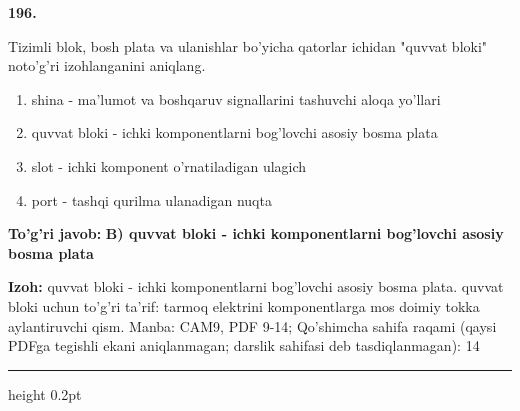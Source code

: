 \documentclass[10pt,a4paper]{article}
\begin{document}
{\bfseries\sffamily\color{ink} 196.}
\par
Tizimli blok, bosh plata va ulanishlar bo'yicha qatorlar ichidan "quvvat bloki" noto'g'ri izohlanganini aniqlang.
\begin{enumerate}[label=\Alph*),leftmargin=9mm]
\item shina - ma'lumot va boshqaruv signallarini tashuvchi aloqa yo'llari
\item quvvat bloki - ichki komponentlarni bog'lovchi asosiy bosma plata
\item slot - ichki komponent o'rnatiladigan ulagich
\item port - tashqi qurilma ulanadigan nuqta
\end{enumerate}
\begin{tcolorbox}[enhanced,breakable,colback=teal!4,colframe=teal!60!black,boxrule=0.45pt,arc=1.2mm,left=2.7mm,right=2.7mm,top=1.8mm,bottom=1.8mm,before skip=2mm,after skip=2mm]
{\bfseries\sffamily\color{teal}To'g'ri javob:} \textbf{B) quvvat bloki - ichki komponentlarni bog'lovchi asosiy bosma plata}
\par\smallskip
{\bfseries Izoh:} quvvat bloki - ichki komponentlarni bog'lovchi asosiy bosma plata. quvvat bloki uchun to'g'ri ta'rif: tarmoq elektrini komponentlarga mos doimiy tokka aylantiruvchi qism. Manba: CAM9, PDF 9-14; Qo'shimcha sahifa raqami (qaysi PDFga tegishli ekani aniqlanmagan; darslik sahifasi deb tasdiqlanmagan): 14
\end{tcolorbox}
\vspace{2mm}\hrule height 0.2pt\vspace{3mm}
\end{document}
